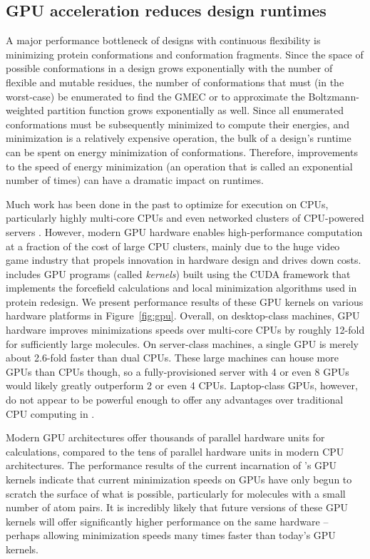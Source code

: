 
\subsection{GPU acceleration reduces design runtimes}

A major performance bottleneck of \osprey designs with continuous flexibility is minimizing protein conformations and conformation fragments. Since the space of possible conformations in a design grows exponentially with the number of flexible and mutable residues, the number of conformations that must (in the worst-case) be enumerated to find the GMEC or to approximate the Boltzmann-weighted partition function grows exponentially as well. Since all enumerated conformations must be subsequently minimized to compute their energies, and minimization is a relatively expensive operation, the bulk of a design's runtime can be spent on energy minimization of conformations. Therefore, improvements to the speed of energy minimization (an operation that is called an exponential number of times) can have a dramatic impact on \osprey runtimes.

Much work has been done in the past to optimize \osprey for execution on CPUs, particularly highly multi-core CPUs and even networked clusters of CPU-powered servers . However, modern GPU hardware enables high-performance computation at a fraction of the cost of large CPU clusters, mainly due to the huge video game industry that propels innovation in hardware design and drives down costs.  includes GPU programs (called {\it kernels}) built using the CUDA framework that implements the forcefield calculations and local minimization algorithms used in protein redesign. We present performance results of these GPU kernels on various hardware platforms in Figure~\ref{fig:gpu}. Overall, on desktop-class machines, GPU hardware improves minimizations speeds over multi-core CPUs by roughly 12-fold for sufficiently large molecules. On server-class machines, a single GPU is merely about 2.6-fold faster than dual CPUs. These large machines can house more GPUs than CPUs though, so a fully-provisioned server with 4 or even 8 GPUs would likely greatly outperform 2 or even 4 CPUs. Laptop-class GPUs, however, do not appear to be powerful enough to offer any advantages over traditional CPU computing in .

Modern GPU architectures offer thousands of parallel hardware units for calculations, compared to the tens of parallel hardware units in modern CPU architectures. The performance results of the current incarnation of \osprey's GPU kernels indicate that current minimization speeds on GPUs have only begun to scratch the surface of what is possible, particularly for molecules with a small number of atom pairs. It is incredibly likely that future versions of these GPU kernels will offer significantly higher performance on the same hardware -- perhaps allowing minimization speeds many times faster than today's GPU kernels.

